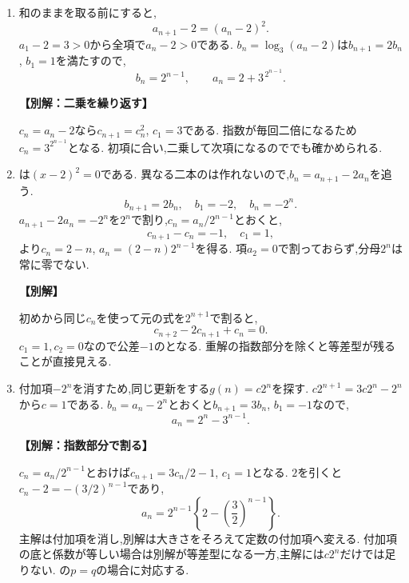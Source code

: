 \begin{enumerate}[label=\textbf{問\arabic*.},leftmargin=3.8em,format=\bookitemlink{practice-basic}{solution}{problem}]
          \item 和のままを取る前にすると,
                  \[
                    a_{n+1}-2=(a_n-2)^2.
                  \]
                  $a_1-2=3>0$から全項で$a_n-2>0$である.
                  $b_n=\log_3(a_n-2)$は$b_{n+1}=2b_n$, $b_1=1$を満たすので,
                  \[
                    b_n=2^{n-1},\qquad a_n=2+3^{\,2^{n-1}}.
                  \]
                  \par\smallskip\noindent\textbf{【別解：二乗を繰り返す】}\par
                  $c_n=a_n-2$なら$c_{n+1}=c_n^2$, $c_1=3$である.
                  指数が毎回二倍になるため$c_n=3^{2^{n-1}}$となる.
                  初項に合い,二乗して次項になるのででも確かめられる.

          \item {}は$(x-2)^2=0$である.
                  異なる二本のは作れないので,$b_n=a_{n+1}-2a_n$を追う.
                  \[
                    b_{n+1}=2b_n,\quad b_1=-2,\quad b_n=-2^n.
                  \]
                  $a_{n+1}-2a_n=-2^n$を$2^n$で割り,$c_n=a_n/2^{n-1}$とおくと,
                  \[
                    c_{n+1}-c_n=-1,\quad c_1=1,
                  \]
                  より$c_n=2-n$, $a_n=(2-n)2^{n-1}$を得る.
                  項$a_2=0$で割っておらず,分母$2^n$は常に零でない.
                  \par\smallskip\noindent\textbf{【別解】}\par
                  初めから同じ$c_n$を使って元の式を$2^{n+1}$で割ると,
                  \[
                    c_{n+2}-2c_{n+1}+c_n=0.
                  \]
                  $c_1=1,c_2=0$なので公差$-1$のとなる.
                  重解の指数部分を除くと等差型が残ることが直接見える.

          \item 付加項$-2^n$を消すため,同じ更新をする$g(n)=c2^n$を探す.
                  $c2^{n+1}=3c2^n-2^n$から$c=1$である.
                  $b_n=a_n-2^n$とおくと$b_{n+1}=3b_n$, $b_1=-1$なので,
                  \[
                    a_n=2^n-3^{n-1}.
                  \]
                  \par\smallskip\noindent\textbf{【別解：指数部分で割る】}\par
                  $c_n=a_n/2^{n-1}$とおけば$c_{n+1}=3c_n/2-1$, $c_1=1$となる.
                  $2$を引くと$c_n-2=-(3/2)^{n-1}$であり,
                  \[
                    a_n=2^{n-1}\left\{2-\left(\frac32\right)^{n-1}\right\}.
                  \]
                  主解は付加項を消し,別解は大きさをそろえて定数の付加項へ変える.
                  付加項の底と係数が等しい場合は別解が等差型になる一方,主解には$c2^n$だけでは足りない.
                  の$p=q$の場合に対応する.


\end{enumerate}
